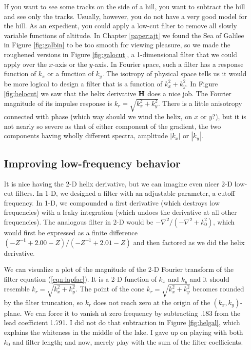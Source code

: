 \par
If you want to see some tracks on the side of a hill,
you want to subtract the hill and see only the tracks.
Usually, however, you do not have a very good model for the hill.
As an 
expedient, you could apply a low-cut filter to remove all
slowly variable functions of altitude.
In Chapter \ref{paper:ajt} we found the Sea of Galilee
in Figure \ref{fig:galbin} to be too smooth for viewing pleasure,
so we made the roughened versions
in Figure \ref{fig:galocut},
a 1-dimensional filter that we could apply
over the $x$-axis or the $y$-axis.
In Fourier space, such a filter has a response function of $k_x$
or a function of $k_y$.
The isotropy of physical space tells us
it would be more logical to design a filter that
is a function of
$k_x^2+k_y^2$.
In Figure \ref{fig:helocut} we saw that the helix derivative
$\bold H$
does a nice job.
The Fourier magnitude of its impulse response is $k_r=\sqrt{k_x^2+k_y^2}$.
There is a little anisotropy connected with phase (which way should
we wind the helix, on $x$ or $y$?), but it is
not nearly so severe as that of either component of the gradient,
the two components having wholly different spectra,
amplitude $|k_x|$ or $|k_y|$.

\subsection{Improving low-frequency behavior}
\par
{}
It is nice having the 2-D helix derivative,
but we can imagine even nicer 2-D low-cut filters.
In 1-D, we designed a filter with an adjustable parameter,
a cutoff frequency.
In 1-D, we compounded
a first derivative (which destroys low frequencies)
with a leaky integration (which undoes the derivative at all other frequencies).
The analogous filter in 2-D would be
$-\nabla^2 /(-\nabla^2 + k_0^2)$,
which would first be expressed as a finite difference
$ (-Z^{-1} + 2.00 - Z) / (-Z^{-1} + 2.01 - Z)$
and then factored as we did the helix derivative.
\par
We can visualize a plot of the magnitude of the 2-D
Fourier transform of the filter equation (\ref{eqn:lapfac}).
It is a 2-D function of $k_x$ and $k_y$ and it should
resemble $k_r=\sqrt{k_x^2+k_y^2}$.
The point of the cone $k_r=\sqrt{k_x^2+k_y^2}$ becomes
rounded by the filter truncation, so
$k_r$ does not reach zero at the origin of the $(k_x,k_y)$-plane.
We can force it to vanish at zero frequency
by subtracting .183 from the lead coefficient 1.791.
I did not do that subtraction in Figure
\ref{fig:helgal},
which explains the whiteness in the middle of the lake.
I gave up on playing with both $k_0$ and filter length;
and now, merely play with the sum of the filter coefficients.
